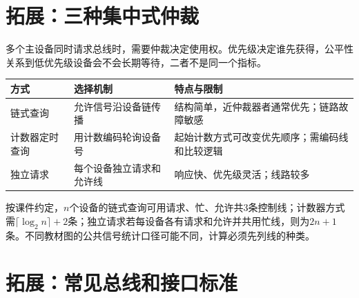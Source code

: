 \section{拓展：三种集中式仲裁}\label{CO06-arbitration-complete}

多个主设备同时请求总线时，需要仲裁决定使用权。优先级决定谁先获得，公平性关系到低优先级设备会不会长期等待，二者不是同一个指标。

\par\medskip\noindent\begin{minipage}{\linewidth}\fontsize{9.3}{12}\selectfont\begin{tabularx}{\linewidth}{@{}YYY@{}}
\toprule\noalign{}
\begin{minipage}[b]{\linewidth}\raggedright
方式
\end{minipage} & \begin{minipage}[b]{\linewidth}\raggedright
选择机制
\end{minipage} & \begin{minipage}[b]{\linewidth}\raggedright
特点与限制
\end{minipage} \\
\midrule\noalign{}


链式查询 & 允许信号沿设备链传播 & 结构简单，近仲裁器者通常优先；链路故障敏感 \\
计数器定时查询 & 用计数编码轮询设备号 & 起始计数方式可改变优先顺序；需编码线和比较逻辑 \\
独立请求 & 每个设备独立请求和允许线 & 响应快、优先级灵活；线路较多 \\
\bottomrule\end{tabularx}
\end{minipage}\par\medskip

按课件约定，\(n\)个设备的链式查询可用请求、忙、允许共3条控制线；计数器方式需\(\lceil\log_2n\rceil+2\)条；独立请求若每设备各有请求和允许并共用忙线，则为\(2n+1\)条。不同教材图的公共信号统计口径可能不同，计算必须先列线的种类。

\section{拓展：常见总线和接口标准}\label{CO06-standards-complete}

